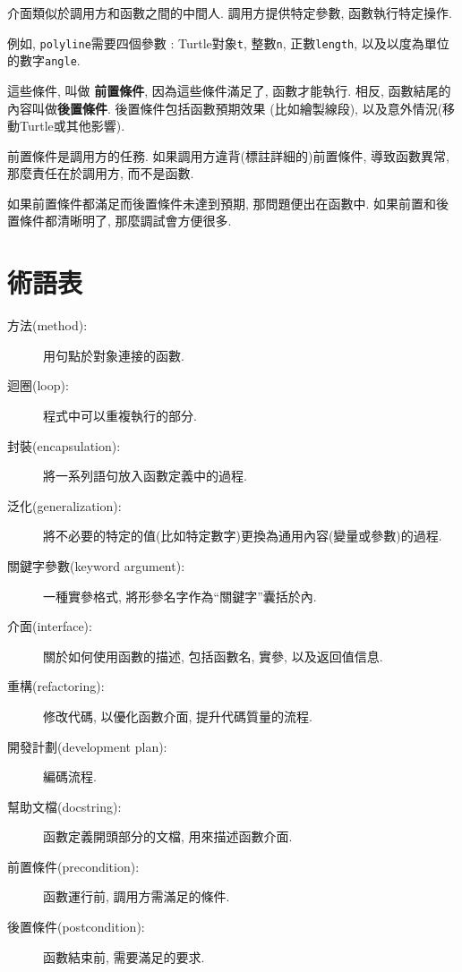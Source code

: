 \documentclass[10pt]{book}
\begin{document}
介面類似於調用方和函數之間的中間人. 
調用方提供特定參數, 函數執行特定操作. 

例如,  {\tt polyline}需要四個參數 : Turtle對象{\tt t},  整數{\tt n}, 
正數{\tt length},  以及以度為單位的數字{\tt angle}.

這些條件, 叫做 {\bf 前置條件},  因為這些條件滿足了, 函數才能執行. 
相反, 函數結尾的內容叫做{\bf 後置條件}. 後置條件包括函數預期效果
(比如繪製線段),  以及意外情況(移動Turtle或其他影響).

前置條件是調用方的任務. 如果調用方違背(標註詳細的)前置條件, 導致函數異常, 
那麼責任在於調用方, 而不是函數. 

如果前置條件都滿足而後置條件未達到預期, 那問題便出在函數中. 
如果前置和後置條件都清晰明了, 那麼調試會方便很多. 

\section{術語表}

\begin{description}

\item[方法(method):] 用句點於對象連接的函數. 

\item[迴圈(loop):] 程式中可以重複執行的部分. 

\item[封裝(encapsulation):] 將一系列語句放入函數定義中的過程. 

\item[泛化(generalization):] 將不必要的特定的值(比如特定數字)更換為通用內容(變量或參數)的過程. 

\item[關鍵字參數(keyword argument):] 一種實參格式, 將形參名字作為``關鍵字''囊括於內. 

\item[介面(interface):] 關於如何使用函數的描述, 包括函數名, 實參, 以及返回值信息. 

\item[重構(refactoring):] 修改代碼, 以優化函數介面, 提升代碼質量的流程.

\item[開發計劃(development plan):] 編碼流程.

\item[幫助文檔(docstring):] 函數定義開頭部分的文檔, 用來描述函數介面. 

\item[前置條件(precondition):] 函數運行前, 調用方需滿足的條件. 

\item[後置條件(postcondition):] 函數結束前, 需要滿足的要求.

\end{description}
\end{document}
